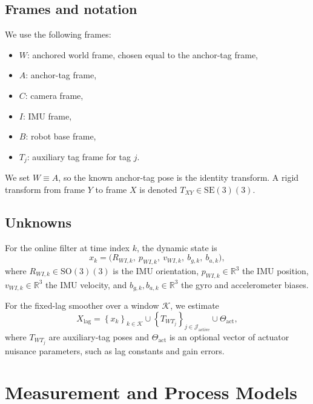 \documentclass[11pt]{article}
\newcommand{\R}{\mathbb{R}}
\newcommand{\SO}{\mathrm{SO}(3)}
\newcommand{\SE}{\mathrm{SE}(3)}
\begin{document}
\subsection{Frames and notation}
We use the following frames:
\begin{itemize}[leftmargin=1.5em]
    \item $W$: anchored world frame, chosen equal to the anchor-tag frame,
    \item $A$: anchor-tag frame,
    \item $C$: camera frame,
    \item $I$: IMU frame,
    \item $B$: robot base frame,
    \item $T_j$: auxiliary tag frame for tag $j$.
\end{itemize}
We set $W \equiv A$, so the known anchor-tag pose is the identity transform. A rigid transform from frame $Y$ to frame $X$ is denoted $T_{XY}\in\SE(3)$.

\subsection{Unknowns}
For the online filter at time index $k$, the dynamic state is
\begin{equation}
    x_k = \big(R_{WI,k},\ p_{WI,k},\ v_{WI,k},\ b_{g,k},\ b_{a,k}\big),
\end{equation}
where $R_{WI,k}\in\SO(3)$ is the IMU orientation, $p_{WI,k}\in\R^3$ the IMU position, $v_{WI,k}\in\R^3$ the IMU velocity, and $b_{g,k},b_{a,k}\in\R^3$ the gyro and accelerometer biases.

For the fixed-lag smoother over a window $\mathcal{K}$, we estimate
\begin{equation}
    X_{\mathrm{lag}} = \left\{x_k\right\}_{k\in\mathcal{K}} \cup \left\{T_{WT_j}\right\}_{j\in\mathcal{J}_{\mathrm{active}}} \cup \Theta_{\mathrm{act}},
\end{equation}
where $T_{WT_j}$ are auxiliary-tag poses and $\Theta_{\mathrm{act}}$ is an optional vector of actuator nuisance parameters, such as lag constants and gain errors.

\section{Measurement and Process Models}
\end{document}
